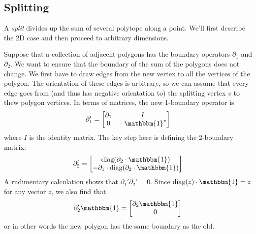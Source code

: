 \documentclass[twocolumn]{article}
\begin{document}
\subsection{Splitting}

A \emph{split} divides up the sum of several polytope along a point.
We'll first describe the 2D case and then proceed to arbitrary dimensions.

Suppose that a collection of adjacent polygons has the boundary operators $\partial_1$ and $\partial_2$.
We want to ensure that the boundary of the sum of the polygons does not change.
We first have to draw edges from the new vertex to all the vertices of the polygon.
The orientation of these edges is arbitrary, so we can assume that every edge goes from (and thus has negative orientation to) the splitting vertex $v$ to thew polygon vertices.
In terms of matrices, the new 1-boundary operator is
\begin{equation}
    \partial_1' = \left[\begin{matrix}\partial_1 & I \\ 0 & -\mathbbm{1}^*\end{matrix}\right]
\end{equation}
where $I$ is the identity matrix.
The key step here is defining the 2-boundary matrix:
\begin{equation}
    \partial_2' = \left[\begin{matrix}\text{diag}(\partial_2\cdot\mathbbm{1}) \\ -\partial_1\cdot\text{diag}(\partial_2\cdot\mathbbm{1})\end{matrix}\right]
\end{equation}
A rudimentary calculation shows that $\partial_1'\partial_2' = 0$.
Since $\text{diag}(z)\cdot\mathbbm{1} = z$ for any vector $z$, we also find that
\begin{equation}
    \partial_2'\mathbbm{1} = \left[\begin{matrix}\partial_2\mathbbm{1} \\ 0\end{matrix}\right]
\end{equation}
or in other words the new polygon has the same boundary as the old.
\end{document}
